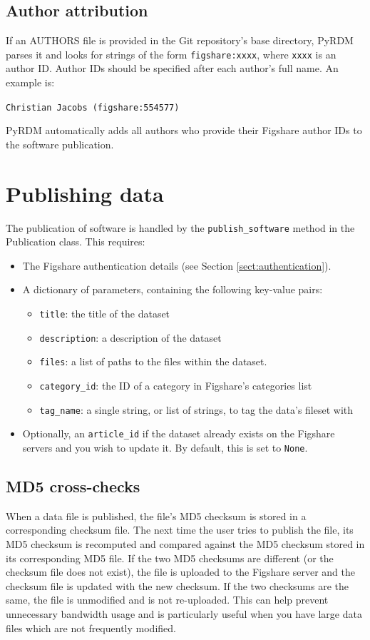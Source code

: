 \documentclass[a4paper,11pt]{report}
\begin{document}
\subsection{Author attribution}
If an AUTHORS file is provided in the Git repository's base directory, PyRDM parses it and looks for strings of the form \texttt{figshare:xxxx}, where \texttt{xxxx} is an author ID. Author IDs should be specified after each author's full name. An example is: 

\texttt{Christian Jacobs (figshare:554577)}

PyRDM automatically adds all authors who provide their Figshare author IDs to the software publication.

\section{Publishing data}
The publication of software is handled by the \texttt{publish\_software} method in the Publication class. This requires:

\begin{itemize}
  \item The Figshare authentication details (see Section \ref{sect:authentication}).
  \item A dictionary of parameters, containing the following key-value pairs:
    \begin{itemize}
      \item \texttt{title}: the title of the dataset
      \item \texttt{description}: a description of the dataset
      \item \texttt{files}: a list of paths to the files within the dataset.
      \item \texttt{category\_id}: the ID of a category in Figshare's categories list
      \item \texttt{tag\_name}: a single string, or list of strings, to tag the data's fileset with
    \end{itemize}
  \item Optionally, an \texttt{article\_id} if the dataset already exists on the Figshare servers and you wish to update it. By default, this is set to \texttt{None}.
\end{itemize}

\subsection{MD5 cross-checks}
When a data file is published, the file's MD5 checksum is stored in a corresponding checksum file. The next time the user tries to publish the file, its MD5 checksum is recomputed and compared against the MD5 checksum stored in its corresponding MD5 file. If the two MD5 checksums are different (or the checksum file does not exist), the file is uploaded to the Figshare server and the checksum file is updated with the new checksum. If the two checksums are the same, the file is unmodified and is not re-uploaded. This can help prevent unnecessary bandwidth usage and is particularly useful when you have large data files which are not frequently modified.
\end{document}
